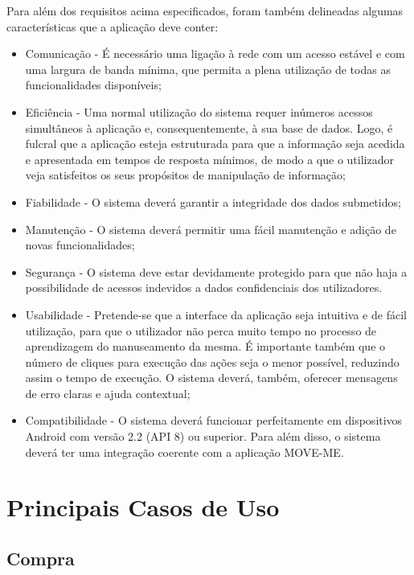 Para além dos requisitos acima especificados, foram também delineadas algumas características que a aplicação deve conter:
\begin{itemize}
\item Comunicação - É necessário uma ligação à rede com um acesso estável e com uma largura de banda mínima, que permita a plena utilização de todas as funcionalidades disponíveis;
\item Eficiência - Uma normal utilização do sistema requer inúmeros acessos simultâneos à aplicação e, consequentemente, à sua base de dados. Logo, é fulcral que a aplicação esteja estruturada para que a informação seja acedida e apresentada em tempos de resposta mínimos, de modo a que o utilizador veja satisfeitos os seus propósitos de manipulação de informação;
\item Fiabilidade - O sistema deverá garantir a integridade dos dados submetidos;
\item Manutenção - O sistema deverá permitir uma fácil manutenção e adição de novas funcionalidades;
\item Segurança - O sistema deve estar devidamente protegido para que não haja a possibilidade de acessos indevidos a dados confidenciais dos utilizadores.
\item Usabilidade - Pretende-se que a interface da aplicação seja intuitiva e de fácil utilização, para que o utilizador não perca muito tempo no processo de aprendizagem do manuseamento da mesma. É importante também que o número de cliques para execução das ações seja o menor possível, reduzindo assim o tempo de execução. O sistema deverá, também, oferecer mensagens de erro claras e ajuda contextual;
\item Compatibilidade - O sistema deverá funcionar perfeitamente em dispositivos Android com versão 2.2 (API 8) ou superior. Para além disso, o sistema deverá ter uma integração coerente com a aplicação MOVE-ME.
\end{itemize}

\section{Principais Casos de Uso}

\subsection{Compra}

